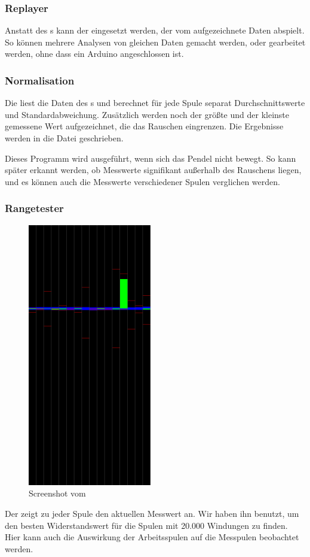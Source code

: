 \subsubsection{Replayer}
Anstatt des s kann der  eingesetzt werden, der vom  aufgezeichnete Daten abspielt.
So können mehrere Analysen von gleichen Daten gemacht werden, oder gearbeitet werden, ohne dass ein Arduino angeschlossen ist.

\subsubsection{Normalisation}
Die  liest die Daten des s und berechnet für jede Spule separat Durchschnittswerte und Standardabweichung.
Zusätzlich werden noch der größte und der kleinste gemessene Wert aufgezeichnet, die das Rauschen eingrenzen.
Die Ergebnisse werden in die Datei  geschrieben.

Dieses Programm wird ausgeführt, wenn sich das Pendel nicht bewegt.
So kann später erkannt werden, ob Messwerte signifikant außerhalb des Rauschens liegen, und es können auch die Messwerte verschiedener Spulen verglichen werden.

\subsubsection{Rangetester}
\begin{figure}
  \includegraphics[width=0.48\textwidth]{images/rangetester.png}
  \caption{Screenshot vom }
  \label{fig:screenrangetester}
\end{figure}
Der  zeigt zu jeder Spule den aktuellen Messwert an.
Wir haben ihn benutzt, um den besten Widerstandswert für die Spulen mit 20.000 Windungen zu finden.
Hier kann auch die Auswirkung der Arbeitsspulen auf die Messpulen beobachtet werden.

